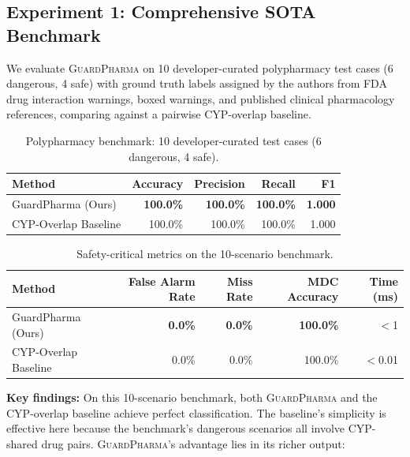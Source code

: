 \documentclass{article}
\theoremstyle{definition}
\begin{document}
\subsection{Experiment 1: Comprehensive SOTA Benchmark}

We evaluate \textsc{GuardPharma} on 10 developer-curated polypharmacy test cases (6 dangerous, 4 safe) with ground truth labels assigned by the authors from FDA drug interaction warnings, boxed warnings, and published clinical pharmacology references, comparing against a pairwise CYP-overlap baseline.

\begin{table}[H]
\centering
\caption{Polypharmacy benchmark: 10 developer-curated test cases (6 dangerous, 4 safe).}
\label{tab:exp1}
\begin{tabular}{@{}lrrrr@{}}
\toprule
\textbf{Method} & \textbf{Accuracy} & \textbf{Precision} & \textbf{Recall} & \textbf{F1} \\
\midrule
GuardPharma (Ours) & \textbf{100.0\%} & \textbf{100.0\%} & \textbf{100.0\%} & \textbf{1.000} \\
CYP-Overlap Baseline & 100.0\% & 100.0\% & 100.0\% & 1.000 \\
\bottomrule
\end{tabular}
\end{table}

\begin{table}[H]
\centering
\caption{Safety-critical metrics on the 10-scenario benchmark.}
\label{tab:safety_metrics}
\begin{tabular}{@{}lrrrr@{}}
\toprule
\textbf{Method} & \textbf{False Alarm Rate} & \textbf{Miss Rate} & \textbf{MDC Accuracy} & \textbf{Time (ms)} \\
\midrule
GuardPharma (Ours) & \textbf{0.0\%} & \textbf{0.0\%} & \textbf{100.0\%} & $<$1 \\
CYP-Overlap Baseline & 0.0\% & 0.0\% & 100.0\% & $<$0.01 \\
\bottomrule
\end{tabular}
\end{table}

\textbf{Key findings:} On this 10-scenario benchmark, both \textsc{GuardPharma} and the CYP-overlap baseline achieve perfect classification. The baseline's simplicity is effective here because the benchmark's dangerous scenarios all involve CYP-shared drug pairs. \textsc{GuardPharma}'s advantage lies in its richer output:
\end{document}

